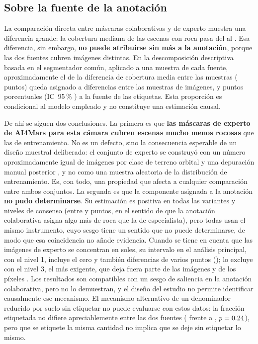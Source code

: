 \subsection{Sobre la fuente de la anotación}

La comparación directa entre máscaras colaborativas y de experto muestra una diferencia grande:
la cobertura mediana de las escenas con roca pasa del \cCobMedVal{} al \cGoldCobMedPos. Esa
diferencia, sin embargo, \textbf{no puede atribuirse sin más a la anotación}, porque las dos
fuentes cubren imágenes distintas. En la descomposición descriptiva basada en el segmentador
común, aplicado a una muestra de cada fuente, aproximadamente el \cDescImgPct{} de la diferencia
de cobertura media entre las muestras (\cDescTotal{} puntos) queda asignado a diferencias entre
las muestras de imágenes, y \cDescAnot{} puntos porcentuales (IC~95\,\% \cDescAnotIC) a la
fuente de las etiquetas. Esta proporción es condicional al modelo empleado y no constituye una
estimación causal.

De ahí se siguen dos conclusiones. La primera es que \textbf{las máscaras de experto de AI4Mars
para esta cámara cubren escenas mucho menos rocosas} que las de entrenamiento. No es un defecto,
sino la consecuencia esperable de un diseño muestral deliberado: el conjunto de experto se
construyó con un número aproximadamente igual de imágenes por clase de terreno orbital y una
depuración manual posterior \citep{swan2021ai4mars}, y no como una muestra aleatoria de la
distribución de entrenamiento. Es, con todo, una propiedad que afecta a cualquier comparación
entre ambos conjuntos. La segunda es que la componente asignada a la anotación \textbf{no pudo
determinarse}. Su estimación es positiva en todas las variantes y niveles de consenso (entre
\cNivDosAnot{} y \cNivTresAnotPrueba{} puntos, en el sentido de que la anotación colaborativa
asigna algo más de roca que la de especialista), pero todas usan el mismo instrumento, cuyo sesgo
tiene un sentido que no puede determinarse, de modo que esa coincidencia no añade evidencia.
Cuando se tiene en cuenta que las imágenes de experto se concentran en \cTempNSolesExp{} soles, su
intervalo en el análisis principal, con el nivel 1, incluye el cero y también diferencias de
varios puntos (\cTempAnotIC); lo excluye con el nivel 3, el más exigente, que deja fuera parte de
las imágenes y de los píxeles \cNivTresAnotSolIC. Los resultados son compatibles con un sesgo de
saliencia en la anotación colaborativa, pero no lo demuestran, y el diseño del estudio no permite
identificar causalmente ese mecanismo. El mecanismo alternativo de un denominador reducido por
suelo sin etiquetar no puede evaluarse con estos datos: la fracción etiquetada no difiere
apreciablemente entre las dos fuentes (\cFracValidMed{} frente a \cFracValidGold,
$p = \num{0.24}$), pero que se etiquete la misma cantidad no implica que se deje sin etiquetar
lo mismo.

